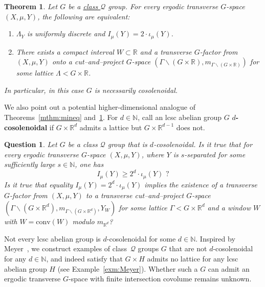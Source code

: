 \documentclass{amsart}
\numberwithin{equation}{subsection}
\newtheorem{que}[thm]{Question}
\newtheorem{mainthm}{Theorem}
\theoremstyle{remark}
\begin{document}
\begin{mainthm}\label{mthm:mineqext}
Let \(G\) be a \hyperlink{classQ}{class \(\mathcal{Q}\)} group. For every ergodic transverse \(G\)-space \(\left(X,\mu,Y\right)\), the following are equivalent:
\begin{enumerate}
    \item \(\Lambda_{Y}\) is uniformly discrete and \(I_{\mu}\left(Y\right)=2\cdot\iota_{\mu}\left(Y\right)\).
    \item There exists a compact interval \(W\subset\mathbb{R}\) and a transverse \(G\)-factor from \(\left(X,\mu,Y\right)\) onto a cut--and--project \(G\)-space \(\left(\Gamma\backslash\left(G\times\mathbb{R}\right),m_{\Gamma\backslash\left(G\times\mathbb{R}\right)}\right)\) for some lattice \(\Lambda<G\times\mathbb{R}\).
\end{enumerate}
In particular, in this case \(G\) is necessarily cosolenoidal.
\end{mainthm}

We also point out a potential higher-dimensional analogue of Theorems~\ref{mthm:mineq} and~\ref{mthm:mineqext}. For \(d\in\mathbb{N}\), call an lcsc abelian group \(G\) \(d\){\bf-cosolenoidal} if \(G\times\mathbb{R}^{d}\) admits a lattice but \(G\times\mathbb{R}^{d-1}\) does not.

\begin{que}
Let \(G\) be a class \(\mathcal{Q}\) group that is \(d\)-cosolenoidal. Is it true that for every ergodic transverse \(G\)-space \(\left(X,\mu,Y\right)\), where \(Y\) is \(s\)-separated for some sufficiently large \(s\in\mathbb{N}\), one has
\[I_{\mu}\left(Y\right)\geq 2^{d}\cdot\iota_{\mu}\left(Y\right)\,\,?\]
Is it true that equality \(I_{\mu}\left(Y\right)=2^{d}\cdot\iota_{\mu}\left(Y\right)\) implies the existence of a transverse \(G\)-factor from \(\left(X,\mu,Y\right)\) to a transverse cut--and--project \(G\)-space \(\left(\Gamma\backslash\left(G\times\mathbb{R}^{d}\right),m_{\Gamma\backslash\left(G\times\mathbb{R}^{d}\right)},Y_{W}\right)\) for some lattice \(\Gamma<G\times\mathbb{R}^{d}\) and a window \(W\) with \(W=\mathrm{conv}\left(W\right)\) modulo \(m_{\mathbb{R}^{d}}\)?
\end{que}

Not every lcsc abelian group is \(d\)-cosolenoidal for some \(d\in\mathbb{N}\). Inspired by Meyer~\cite[Ch.~II, \S11]{meyer1972algebraic}, we construct examples of class~\(\mathcal{Q}\) groups \(G\) that are not \(d\)-cosolenoidal for any \(d\in\mathbb{N}\), and indeed satisfy that \(G\times H\) admits no lattice for any lcsc abelian group \(H\) (see Example~\ref{exm:Meyer}). Whether such a \(G\) can admit an ergodic transverse \(G\)-space with finite intersection covolume remains unknown.
\end{document}
